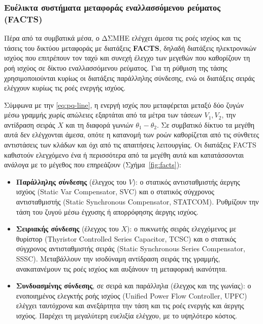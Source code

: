 \subsubsection{Ευέλικτα συστήματα μεταφοράς εναλλασσόμενου ρεύματος (FACTS)}
\label{sec:facts}

Πέρα από τα συμβατικά μέσα, ο ΔΣΜΗΕ ελέγχει άμεσα τις ροές ισχύος και τις τάσεις του δικτύου
μεταφοράς με διατάξεις \textbf{FACTS}, δηλαδή διατάξεις ηλεκτρονικών ισχύος που επιτρέπουν τον
ταχύ και συνεχή έλεγχο των μεγεθών που καθορίζουν τη ροή ισχύος σε δίκτυο εναλλασσόμενου
ρεύματος. Για τη ρύθμιση της τάσης χρησιμοποιούνται κυρίως οι διατάξεις παράλληλης σύνδεσης,
ενώ οι διατάξεις σειράς ελέγχουν κυρίως τις ροές ενεργής ισχύος.

Σύμφωνα με την \eqref{eq:pq-line}, η ενεργή ισχύς που μεταφέρεται μεταξύ δύο ζυγών μέσω
γραμμής χωρίς απώλειες εξαρτάται από τα μέτρα των τάσεων $V_1, V_2$, την αντίδραση σειράς
$X$ και τη διαφορά γωνιών $\theta_1 - \theta_2$. Σε
συμβατικό δίκτυο τα μεγέθη αυτά δεν ελέγχονται άμεσα, οπότε η κατανομή των ροών καθορίζεται
από τις σύνθετες αντιστάσεις των κλάδων και όχι από τις απαιτήσεις λειτουργίας. Οι διατάξεις
FACTS καθιστούν ελεγχόμενο ένα ή περισσότερα από τα μεγέθη αυτά και κατατάσσονται ανάλογα με
το μέγεθος που επηρεάζουν (Σχήμα~\ref{fig:facts}):

\begin{itemize}
\item \textbf{Παράλληλης σύνδεσης} (έλεγχος του $V$): ο στατικός αντισταθμιστής άεργης ισχύος
      (Static Var Compensator, SVC) και ο στατικός σύγχρονος αντισταθμιστής (Static
      Synchronous Compensator, STATCOM). Ρυθμίζουν την τάση του ζυγού μέσω έγχυσης ή
      απορρόφησης άεργης ισχύος.
\item \textbf{Σειριακής σύνδεσης} (έλεγχος του $X$): ο πυκνωτής σειράς ελεγχόμενος με
      θυρίστορ (Thyristor Controlled Series Capacitor, TCSC) και ο στατικός σύγχρονος
      αντισταθμιστής σειράς (Static Synchronous Series Compensator, SSSC). Μεταβάλλουν την
      ισοδύναμη αντίδραση σειράς της γραμμής, ανακατανέμουν τις ροές ισχύος και αυξάνουν τη
      μεταφορική ικανότητα.
\item \textbf{Συνδυασμένης σύνδεσης}, σε σειρά και παράλληλα (έλεγχος και της γωνίας): ο
      ενοποιημένος ελεγκτής ροής ισχύος (Unified Power Flow Controller, UPFC) ελέγχει
      ταυτόχρονα και ανεξάρτητα την τάση και τις ροές ενεργής και άεργης ισχύος. Παρέχει τη
      μεγαλύτερη ευελιξία ελέγχου, με το υψηλότερο κόστος.
\end{itemize}

